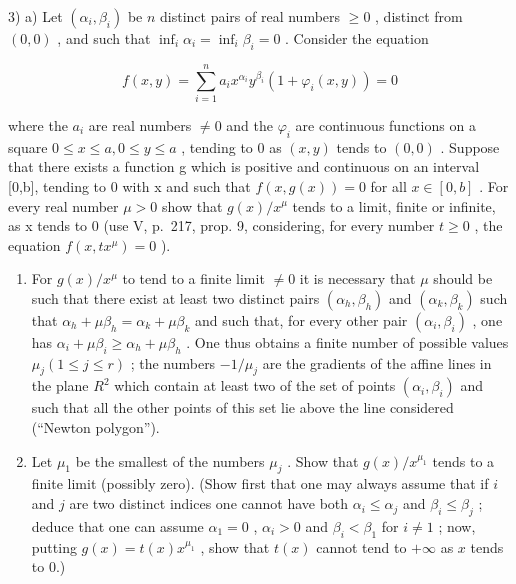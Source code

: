 3) a) Let \((\alpha_{i},\beta_{i})\) be \(n\) distinct pairs of real numbers \(\geqslant 0\) , distinct from \((0,0)\) , and such that \(\inf_{i}\alpha_{i} = \inf_{i}\beta_{i} = 0\) . Consider the equation

\[
f (x, y) = \sum_ {i = 1} ^ {n} a _ {i} x ^ {\alpha_ {i}} y ^ {\beta_ {i}} \left(1 + \varphi_ {i} (x, y)\right) = 0
\]

where the \(a_{i}\) are real numbers \(\neq0\) and the \(\varphi_{i}\) are continuous functions on a square \(0\leqslant x\leqslant a,0\leqslant y\leqslant a\) , tending to 0 as \((x,y)\) tends to \((0,0)\) . Suppose that there exists a function g which is positive and continuous on an interval {[}0,b{]}, tending to 0 with x and such that \(f(x,g(x))=0\) for all \(x\in[0,b]\) . For every real number \(\mu>0\) show that \(g(x)/x^{\mu}\) tends to a limit, finite or infinite, as x tends to 0 (use V, p.~217, prop. 9, considering, for every number \(t\geqslant0\) , the equation \(f(x,tx^{\mu})=0\) ).

\begin{enumerate}
\def\labelenumi{\alph{enumi})}
\setcounter{enumi}{1}
\item
  For \(g(x)/x^{\mu}\) to tend to a finite limit \(\neq0\) it is necessary that \(\mu\) should be such that there exist at least two distinct pairs \((\alpha_{h},\beta_{h})\) and \((\alpha_{k},\beta_{k})\) such that \(\alpha_{h}+\mu\beta_{h}=\alpha_{k}+\mu\beta_{k}\) and such that, for every other pair \((\alpha_{i},\beta_{i})\) , one has \(\alpha_{i}+\mu\beta_{i}\geqslant\alpha_{h}+\mu\beta_{h}\) . One thus obtains a finite number of possible values \(\mu_{j}(1\leqslant j\leqslant r)\) ; the numbers \(-1/\mu_{j}\) are the gradients of the affine lines in the plane \(R^{2}\) which contain at least two of the set of points \((\alpha_{i},\beta_{i})\) and such that all the other points of this set lie above the line considered (``Newton polygon'').
\item
  Let \(\mu_{1}\) be the smallest of the numbers \(\mu_{j}\) . Show that \(g(x) / x^{\mu_1}\) tends to a finite limit (possibly zero). (Show first that one may always assume that if \(i\) and \(j\) are two distinct indices one cannot have both \(\alpha_{i} \leqslant \alpha_{j}\) and \(\beta_{i} \leqslant \beta_{j}\) ; deduce that one can assume \(\alpha_{1} = 0\) , \(\alpha_{i} > 0\) and \(\beta_{i} < \beta_{1}\) for \(i \neq 1\) ; now, putting \(g(x) = t(x)x^{\mu_1}\) , show that \(t(x)\) cannot tend to \(+\infty\) as \(x\) tends to 0.)
\end{enumerate}

